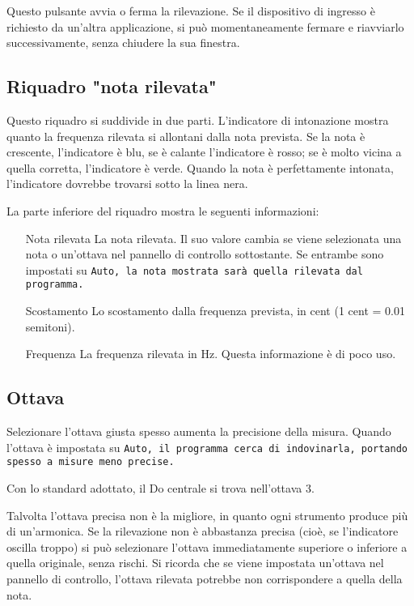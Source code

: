 Questo pulsante avvia o ferma la rilevazione. Se il dispositivo
di ingresso è richiesto da un'altra applicazione, si può
momentaneamente fermare  e riavviarlo successivamente,
senza chiudere la sua finestra.

\subsection{Riquadro "nota rilevata"}\label{detectednote}

Questo riquadro si suddivide in due parti. L'indicatore di
intonazione mostra quanto la frequenza rilevata si allontani
dalla nota prevista. Se la nota è crescente, l'indicatore
è blu, se è calante l'indicatore è rosso; se è molto vicina
a quella corretta, l'indicatore è verde. Quando la nota
è perfettamente intonata, l'indicatore dovrebbe trovarsi
sotto la linea nera.

La parte inferiore del riquadro mostra le seguenti informazioni:

\begin{itemize}
\item[Nota rilevata] La nota rilevata. Il suo valore cambia
se viene selezionata una nota o un'ottava nel pannello di controllo
sottostante. Se entrambe sono impostati su \tt{Auto}, la nota
mostrata sarà quella rilevata dal programma.
\item[Scostamento] Lo scostamento dalla frequenza prevista,
in cent (1 cent = 0.01 semitoni).
\item[Frequenza] La frequenza rilevata in Hz. Questa informazione
è di poco uso.
\end{itemize}

\subsection{Ottava}\label{octave}

Selezionare l'ottava giusta spesso aumenta la precisione della misura.
Quando l'ottava è impostata su \tt{Auto}, il programma cerca di
indovinarla, portando spesso a misure meno precise.

Con lo standard adottato, il Do centrale si trova nell'ottava 3.

Talvolta l'ottava precisa non è la migliore, in quanto ogni strumento
produce più di un'armonica. Se la rilevazione non è abbastanza precisa
(cioè, se l'indicatore oscilla troppo) si può selezionare l'ottava
immediatamente superiore o inferiore a quella originale, senza rischi.
Si ricorda che se viene impostata un'ottava nel pannello di controllo,
l'ottava rilevata potrebbe non corrispondere a quella della nota.

